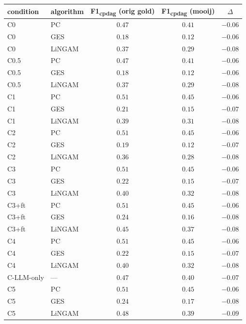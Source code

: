 \begin{tabular}{llccc}
\hline
condition & algorithm & F1\textsubscript{cpdag} (orig gold) & F1\textsubscript{cpdag} (mooij) & $\Delta$ \\
\hline
C0 & PC & $0.47$ & $0.41$ & $-0.06$ \\
C0 & GES & $0.18$ & $0.12$ & $-0.06$ \\
C0 & LiNGAM & $0.37$ & $0.29$ & $-0.08$ \\
C0.5 & PC & $0.47$ & $0.41$ & $-0.06$ \\
C0.5 & GES & $0.18$ & $0.12$ & $-0.06$ \\
C0.5 & LiNGAM & $0.37$ & $0.29$ & $-0.08$ \\
C1 & PC & $0.51$ & $0.45$ & $-0.06$ \\
C1 & GES & $0.21$ & $0.15$ & $-0.07$ \\
C1 & LiNGAM & $0.39$ & $0.31$ & $-0.08$ \\
C2 & PC & $0.51$ & $0.45$ & $-0.06$ \\
C2 & GES & $0.19$ & $0.12$ & $-0.07$ \\
C2 & LiNGAM & $0.36$ & $0.28$ & $-0.08$ \\
C3 & PC & $0.51$ & $0.45$ & $-0.06$ \\
C3 & GES & $0.22$ & $0.15$ & $-0.07$ \\
C3 & LiNGAM & $0.40$ & $0.32$ & $-0.08$ \\
C3+ft & PC & $0.51$ & $0.45$ & $-0.06$ \\
C3+ft & GES & $0.24$ & $0.16$ & $-0.08$ \\
C3+ft & LiNGAM & $0.45$ & $0.37$ & $-0.08$ \\
C4 & PC & $0.51$ & $0.45$ & $-0.06$ \\
C4 & GES & $0.22$ & $0.15$ & $-0.07$ \\
C4 & LiNGAM & $0.40$ & $0.32$ & $-0.08$ \\
C-LLM-only & --- & $0.47$ & $0.40$ & $-0.07$ \\
C5 & PC & $0.51$ & $0.45$ & $-0.06$ \\
C5 & GES & $0.24$ & $0.17$ & $-0.08$ \\
C5 & LiNGAM & $0.48$ & $0.39$ & $-0.09$ \\
\hline
\end{tabular}
